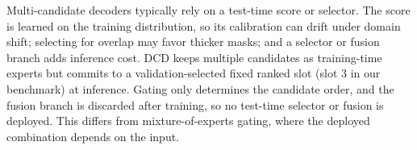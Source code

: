 Multi-candidate decoders typically rely on a test-time score or selector. The
score is learned on the training distribution, so its calibration can drift
under domain shift; selecting for overlap may favor thicker masks; and a
selector or fusion branch adds inference cost. DCD keeps multiple candidates
as training-time experts but commits to a validation-selected fixed ranked
slot (slot 3 in our benchmark) at inference. Gating only determines the candidate
order, and the fusion branch is discarded after training, so no test-time
selector or fusion is deployed. This differs from mixture-of-experts gating,
where the deployed combination depends on the input.

